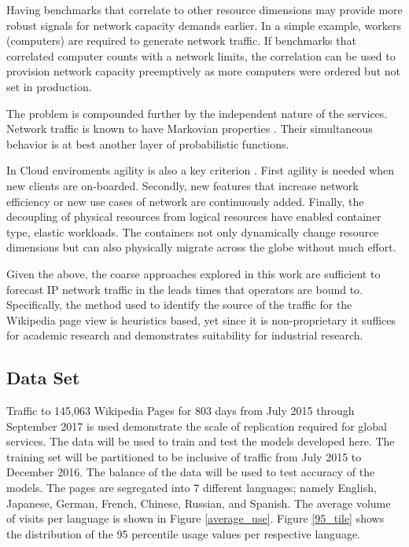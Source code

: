 \documentclass[conference]{IEEEtran}
\begin{document}
Having benchmarks that correlate to other resource dimensions may provide more robust signals for network capacity demands earlier. In a simple example, workers (computers) are required to generate network traffic. If benchmarks that correlated computer counts with a network limits, the correlation can be used to provision network capacity preemptively as more computers were ordered but not set in production. 

The problem is compounded further by the independent nature of the services. Network traffic is known to have Markovian properties \cite{Harchol-Balter}. Their simultaneous behavior is at best another layer of probabilistic functions.  

In Cloud enviroments agility is also a key criterion \cite{Spanner}. First agility is needed when new clients are on-boarded. Secondly, new features that increase network efficiency or new use cases of network are continuously added. Finally, the decoupling of physical resources from logical resources have enabled container type, elastic workloads. The containers not only dynamically change resource dimensions but can also physically migrate across the globe without much effort. 

Given the above, the coarse approaches explored in this work are sufficient to forecast IP network traffic in the leads times that operators are bound to. Specifically, the method used to identify the source of the traffic for the Wikipedia page view is heuristics based, yet since it is non-proprietary it suffices for academic research and demonstrates suitability for industrial research.

\subsection{Data Set}
Traffic to 145,063 Wikipedia Pages for 803 days from July 2015 through September 2017 is used demonstrate the scale of replication required for global services. The data will be used to train and test the models developed here. The training set will be partitioned to be inclusive of traffic from July 2015 to December 2016. The balance of the data will be used to test accuracy of the models. The pages are segregated into 7 different languages; namely English, Japanese, German, French, Chinese, Russian, and Spanish. The average volume of visits per language is shown in Figure \ref{average_use}. Figure \ref{95_tile} shows the distribution of the 95 percentile usage values per respective language.   
\end{document}
